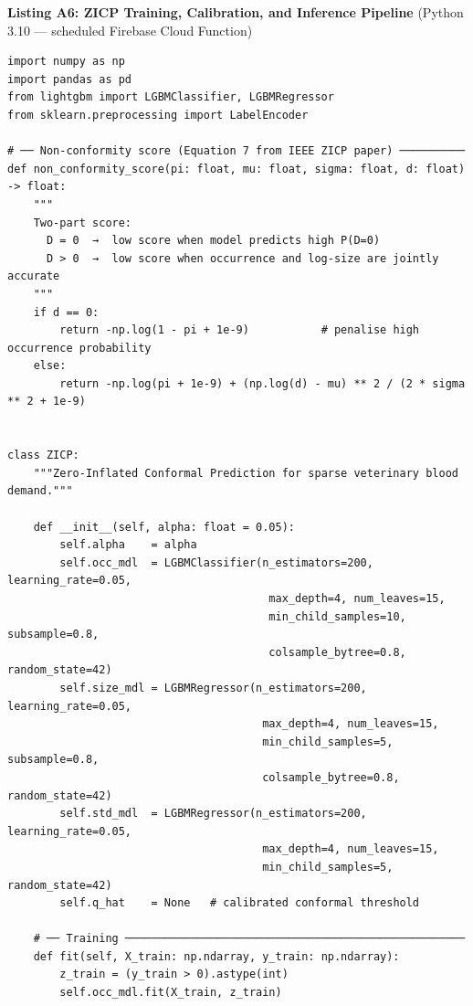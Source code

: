 \documentclass[12pt,a4paper]{article}
\begin{document}
\vspace{1.2em}
\noindent\textbf{Listing A6: ZICP Training, Calibration, and Inference Pipeline}
(Python 3.10 — scheduled Firebase Cloud Function)
\vspace{0.4em}
\begin{lstlisting}[language=Python3, caption={Complete Zero-Inflated Conformal Prediction (ZICP) implementation as described in the IEEE ZICP paper. LightGBM models are trained for occurrence and log-normal size; non-conformity scores are computed on held-out calibration data; the empirical quantile threshold is used to construct distribution-free prediction intervals for the next 7 days per clinic per blood type.}]
import numpy as np
import pandas as pd
from lightgbm import LGBMClassifier, LGBMRegressor
from sklearn.preprocessing import LabelEncoder

# ── Non-conformity score (Equation 7 from IEEE ZICP paper) ──────────
def non_conformity_score(pi: float, mu: float, sigma: float, d: float) -> float:
    """
    Two-part score:
      D = 0  →  low score when model predicts high P(D=0)
      D > 0  →  low score when occurrence and log-size are jointly accurate
    """
    if d == 0:
        return -np.log(1 - pi + 1e-9)           # penalise high occurrence probability
    else:
        return -np.log(pi + 1e-9) + (np.log(d) - mu) ** 2 / (2 * sigma ** 2 + 1e-9)


class ZICP:
    """Zero-Inflated Conformal Prediction for sparse veterinary blood demand."""

    def __init__(self, alpha: float = 0.05):
        self.alpha    = alpha
        self.occ_mdl  = LGBMClassifier(n_estimators=200, learning_rate=0.05,
                                        max_depth=4, num_leaves=15,
                                        min_child_samples=10, subsample=0.8,
                                        colsample_bytree=0.8, random_state=42)
        self.size_mdl = LGBMRegressor(n_estimators=200, learning_rate=0.05,
                                       max_depth=4, num_leaves=15,
                                       min_child_samples=5, subsample=0.8,
                                       colsample_bytree=0.8, random_state=42)
        self.std_mdl  = LGBMRegressor(n_estimators=200, learning_rate=0.05,
                                       max_depth=4, num_leaves=15,
                                       min_child_samples=5, random_state=42)
        self.q_hat    = None   # calibrated conformal threshold

    # ── Training ────────────────────────────────────────────────────
    def fit(self, X_train: np.ndarray, y_train: np.ndarray):
        z_train = (y_train > 0).astype(int)
        self.occ_mdl.fit(X_train, z_train)


\end{lstlisting}
\end{document}
